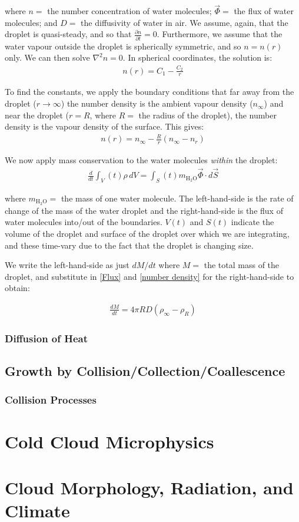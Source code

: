 \noindent where $n=$ the number concentration of water molecules; $\vec{\Phi}=$ the flux of water molecules; and $D=$ the diffusivity of water in air. We assume, again, that the droplet is quasi-steady, and so that $\frac{\partial n}{\partial t}=0$. Furthermore, we assume that the water vapour outside the droplet is spherically symmetric, and so $n=n(r)$ only. We can then solve $\nabla^2 n=0$. In spherical coordinates, the solution is:
\begin{align*}
    n(r)=C_1-\frac{C_2}{r}
\end{align*}

To find the constants, we apply the boundary conditions that far away from the droplet ($r\to\infty$) the number density is the ambient vapour density ($n_\infty$) and near the droplet ($r=R$, where $R=$ the radius of the droplet), the number density is the vapour density of the surface. This gives:
\begin{align*}
    n(r)=n_\infty-\frac{R}{r}(n_\infty-n_r)
\end{align*}

We now apply mass conservation to the water molecules \textit{within} the droplet:
\begin{align}
    \label{number density}
    \frac{d}{dt}\int_V(t) \rho\, dV = \int_S(t) m_{\text{H$_2$O}} \vec{\Phi} \cdot d\vec{S}
\end{align}

\noindent where $m_\text{H$_2$O}=$ the mass of one water molecule. The left-hand-side is the rate of change of the mass of the water droplet and the right-hand-side is the flux of water molecules into/out of the boundaries. $V(t)$ and $S(t)$ indicate the volume of the droplet and surface of the droplet over which we are integrating, and these time-vary due to the fact that the droplet is changing size.

We write the left-hand-side as just $dM/dt$ where $M=$ the total mass of the droplet, and substitute in \ref{Flux} and \ref{number density} for the right-hand-side to obtain:

\begin{align}
    \boxed{
        \frac{dM}{dt}=
        4\pi R D (\rho_\infty-\rho_R)
    }
\end{align}


\subsection{Diffusion of Heat}

\section{Growth by Collision/Collection/Coallescence}

\subsection{Collision Processes}

\chapter{Cold Cloud Microphysics}

\chapter{Cloud Morphology, Radiation, and Climate}
